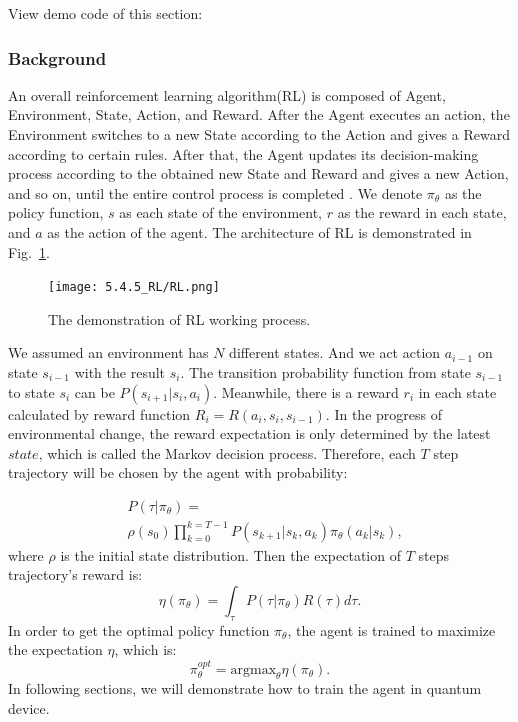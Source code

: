 View demo code of this section:  \ 

\subsubsection{Background}

An overall reinforcement learning algorithm(RL) is composed of Agent, Environment, State, Action, and Reward. After the Agent executes an action, the Environment switches to a new State according to the Action and gives a Reward according to certain rules. After that, the Agent updates its decision-making process according to the obtained new State and Reward and gives a new Action, and so on, until the entire control process is completed \cite{kaelbling1996reinforcement}. We denote $\pi_{\theta}$ as the policy function, $s$ as each state of the environment, $r$ as the reward in each state, and $a$ as the action of the agent. The architecture of RL is demonstrated in Fig.~\ref{RL_frame}.
\begin{figure}[ht]
  \centering
  \texttt{[image: 5.4.5\_RL/RL.png]}
  \caption{\label{RL_frame} The demonstration of RL working process.}
\end{figure}

We assumed an environment has $N$ different states. And we act action $a_{i-1}$ on state $s_{i-1}$ with the result $s_{i}$. The transition probability function from state $s_{i-1}$ to state $s_{i}$ can be $P(s_{i+1}|s_{i},a_{i})$. Meanwhile, there is a reward $r_i$ in each state calculated by reward function $R_i=R(a_i,s_i,s_{i-1})$. In the progress of environmental change, the reward expectation is only determined by the latest $state$, which is called the Markov decision process. Therefore, each $T$ step trajectory will be chosen by the agent with probability:

\begin{equation}
    \begin{split}
        &P(\tau|\pi_{\theta})=\\
        &\rho(s_0)\prod_{k=0}^{k=T-1}P(s_{k+1}|s_{k},a_{k})\pi_{\theta}(a_{k}|s_{k}),
    \end{split}
\end{equation}
where $\rho$ is the initial state distribution. Then the expectation of $T$ steps trajectory's reward is:
\begin{equation}
    \eta(\pi_{\theta})=\int_{\tau}P(\tau|\pi_{\theta})R(\tau)d\tau.
\end{equation}
In order to get the optimal policy function $\pi_{\theta}$, the agent is trained to maximize the expectation $\eta$, which is:
\begin{equation}
    \pi_{\theta}^{opt}=\mathrm{argmax}_{\theta}\eta(\pi_{\theta}).
\end{equation}
In following sections, we will demonstrate how to train the agent in quantum device.


